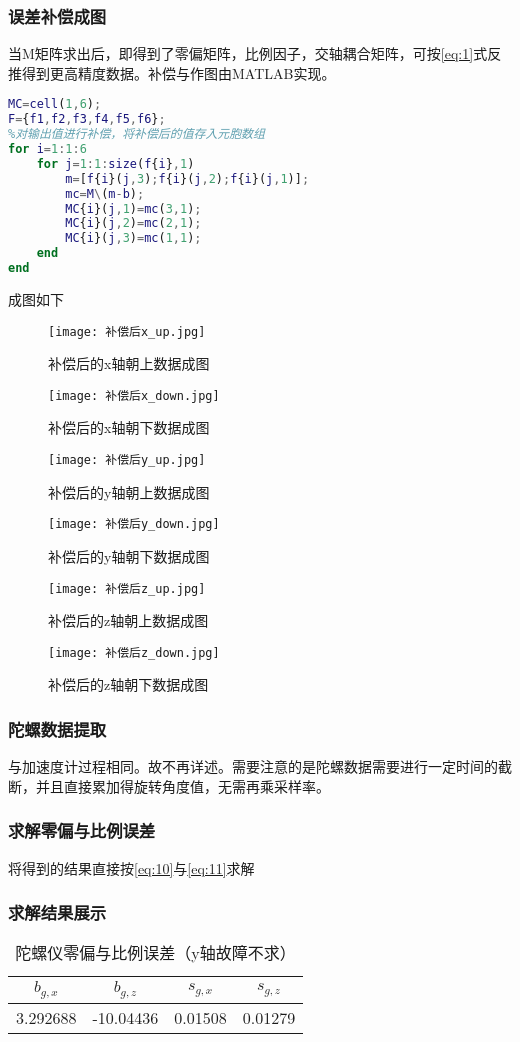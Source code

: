 \documentclass{ctexart}
\begin{document}
\subsubsection{误差补偿成图}
当M矩阵求出后，即得到了零偏矩阵，比例因子，交轴耦合矩阵，可按\eqref{eq:1}式反推得到更高精度数据。补偿与作图由MATLAB实现。
\begin{lstlisting}[language=matlab]
MC=cell(1,6);
F={f1,f2,f3,f4,f5,f6};
%对输出值进行补偿，将补偿后的值存入元胞数组
for i=1:1:6
    for j=1:1:size(f{i},1)
        m=[f{i}(j,3);f{i}(j,2);f{i}(j,1)];
        mc=M\(m-b);
        MC{i}(j,1)=mc(3,1);
        MC{i}(j,2)=mc(2,1);
        MC{i}(j,3)=mc(1,1);
    end
end
\end{lstlisting}
成图如下
\begin{figure}[H]
\texttt{[image: 补偿后x\_up.jpg]}
\caption{补偿后的x轴朝上数据成图}
\end{figure}
\begin{figure}[H]
\texttt{[image: 补偿后x\_down.jpg]}
\caption{补偿后的x轴朝下数据成图}
\end{figure}
\begin{figure}[H]
\texttt{[image: 补偿后y\_up.jpg]}
\caption{补偿后的y轴朝上数据成图}
\end{figure}
\begin{figure}[H]
\texttt{[image: 补偿后y\_down.jpg]}
\caption{补偿后的y轴朝下数据成图}
\end{figure}
\begin{figure}[H]
\texttt{[image: 补偿后z\_up.jpg]}
\caption{补偿后的z轴朝上数据成图}
\end{figure}
\begin{figure}[H]
\texttt{[image: 补偿后z\_down.jpg]}
\caption{补偿后的z轴朝下数据成图}
\end{figure}
\subsubsection{陀螺数据提取}
与加速度计过程相同。故不再详述。需要注意的是陀螺数据需要进行一定时间的截断，并且直接累加得旋转角度值，无需再乘采样率。
\subsubsection{求解零偏与比例误差}
将得到的结果直接按\eqref{eq:10}与\eqref{eq:11}求解
\subsubsection{求解结果展示}
\begin{table}[H]
	\centering
	\begin{tabular}{cccc}
	\toprule[1.5pt]
	$b_{g,x}$&$b_{g,z}$&$s_{g,x}$&$s_{g,z}$\\
	\midrule
	3.292688&-10.04436&0.01508&0.01279\\
	\bottomrule[1.5pt]
	\end{tabular}
	\caption{陀螺仪零偏与比例误差（y轴故障不求）}
\end{table}
\end{document}
